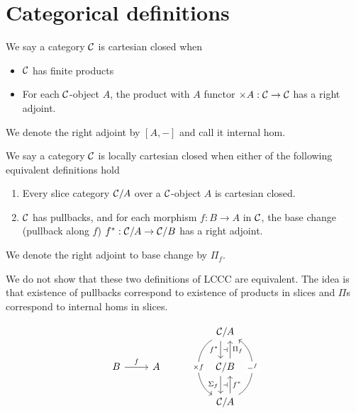 \section{Categorical definitions}

\begin{dfn}
  We say a category $\mathcal{C}$ is cartesian closed when
  \begin{itemize}
    \item $\mathcal{C}$ has finite products
    \item For each $\mathcal{C}$-object $A$, the product with $A$ functor $\times A : \mathcal{C} \to \mathcal{C}$ has a right adjoint.
  \end{itemize}
  We denote the right adjoint by $[A,-]$ and call it internal hom.
\end{dfn}

\begin{dfn}
  We say a category $\mathcal{C}$ is locally cartesian closed when either of the following equivalent definitions hold
  \begin{enumerate}
    \item Every slice category $\mathcal{C} / A$ over a $\mathcal{C}$-object $A$ is cartesian closed.
    \item $\mathcal{C}$ has pullbacks, and for each morphism $f : B \to A$ in $\mathcal{C}$,
          the base change (pullback along $f$) $f^{*} : \mathcal{C} / A \to \mathcal{C} / B$ has a right adjoint.
  \end{enumerate}
  We denote the right adjoint to base change by $\Pi_{f}$.
\end{dfn}

We do not show that these two definitions of LCCC are equivalent.
The idea is that existence of pullbacks correspond to existence of products in slices
and $\Pi$s correspond to internal homs in slices.

\[\begin{tikzcd}
	&&& {\CC/A} \\
	B & A && {\CC/B} \\
	&&& {\CC/A}
	\arrow[""{name=0, anchor=center, inner sep=0}, "{f^*}"', shift right=2, from=1-4, to=2-4]
	\arrow[""{name=1, anchor=center, inner sep=0}, "{\Pi_f}"', shift right=2, from=2-4, to=1-4]
	\arrow[""{name=2, anchor=center, inner sep=0}, "{\Si_f}"', shift right=2, from=2-4, to=3-4]
	\arrow[""{name=3, anchor=center, inner sep=0}, "{f^*}"', shift right=2, from=3-4, to=2-4]
	\arrow["{\times f}"{description}, bend left = {- 60}, from=1-4, to=3-4]
	\arrow["{-^f}"{description}, bend left = {- 60}, from=3-4, to=1-4]
	\arrow["f", from=2-1, to=2-2]
	\arrow["\dashv"{anchor=center}, draw=none, from=0, to=1]
	\arrow["\dashv"{anchor=center}, draw=none, from=2, to=3]
\end{tikzcd}\]


